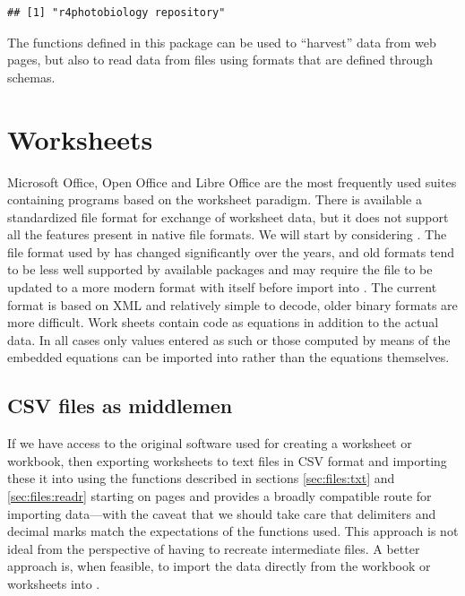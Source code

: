 \documentclass[krantz2]{krantz}\usepackage{knitr}%
\begin{document}
\begin{knitrout}\footnotesize
{}\color{fgcolor}\begin{kframe}
\begin{alltt}
\hlstd{(} \hlstd{))}
\end{alltt}
\begin{verbatim}
## [1] "r4photobiology repository"
\end{verbatim}
\end{kframe}
\end{knitrout}

The functions defined in this package can be used to ``harvest'' data from web pages, but also to read data from files using formats that are defined through  schemas.

\section{Worksheets}\label{sec:files:worksheets}

Microsoft Office, Open Office and Libre Office are the most frequently used suites containing programs based on the worksheet paradigm. There is available a standardized file format for exchange of worksheet data, but it does not support all the features present in native file formats. We will start by considering . The file format used by  has changed significantly over the years, and old formats tend to be less well supported by available \Rlang packages and may require the file to be updated to a more modern format with  itself before import into \Rlang. The current format is based on XML and relatively simple to decode, older binary formats are more difficult. Work sheets contain code as equations in addition to the actual data. In all cases only values entered as such or those computed by means of the embedded equations can be imported into \Rlang rather than the equations themselves.

\subsection{CSV files as middlemen}

If we have access to the original software used for creating a worksheet or workbook, then exporting worksheets to text files in CSV format and importing these it into \Rlang using the functions described in sections \ref{sec:files:txt} and \ref{sec:files:readr} starting on pages \pageref{sec:files:txt} and \pageref{sec:files:readr} provides a broadly compatible route for importing data---with the caveat that we should take care that delimiters and decimal marks match the expectations of the functions used. This approach is not ideal from the perspective of having to recreate intermediate files. A better approach is, when feasible, to import the data directly from the workbook or worksheets into \Rlang.
\end{document}
